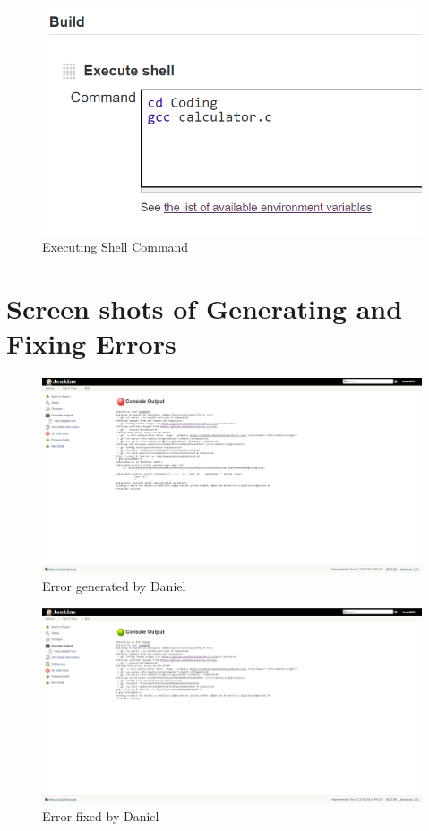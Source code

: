 \documentclass[UTF8]{article}
\begin{document}
\begin{figure}[h]
  \includegraphics[width=\textwidth, height=\textheight,keepaspectratio]{ExecuteShell}
  \caption{Executing Shell Command}
\end{figure}

\newpage
\section{Screen shots of Generating and Fixing Errors}
\begin{figure}[h]
  \includegraphics[width=\textwidth, height=\textheight,keepaspectratio]{Break1Daniel.PNG}
  \caption{Error generated by Daniel}
\end{figure}

\newpage
\begin{figure}[h]
  \includegraphics[width=\textwidth, height=\textheight,keepaspectratio]{BreakFix1Daniel.PNG}
  \caption{Error fixed by Daniel}
\end{figure}
\end{document}
